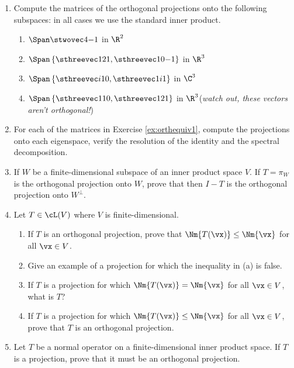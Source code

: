 \begin{exercises}
\begin{enumerate}[label=\thesubsection.\arabic*., align=right]
  \item Compute the matrices of the orthogonal projections onto the following subspaces: in all cases we use the standard inner product.
  \begin{enumerate}
    \item $\Span\stwovec 4{-1}$ in $\R^2$
    \item $\Span\left\{\sthreevec 121,\sthreevec 10{-1}\right\}$ in $\R^3$
    \item $\Span\left\{\sthreevec i10,\sthreevec 1i1\right\}$ in $\C^3$
    \item $\Span\left\{\sthreevec 110,\sthreevec 121\right\}$ in $\R^3$\quad (\emph{watch out, these vectors aren't orthogonal!})
	\end{enumerate}
	
	\item For each of the matrices in Exercise \ref{ex:orthequiv1}, compute the projections onto each eigenspace, verify the resolution of the identity and the spectral decomposition.
	
	\item If $W$ be a finite-dimensional subspace of an inner product space $V$. If $T=\pi_W$ is the orthogonal projection onto $W$, prove that then $I-T$ is the orthogonal projection onto $W^\perp$.
	
	\item Let $T\in\cL(V)$ where $V$ is finite-dimensional.
	\begin{enumerate}
	  \item If $T$ is an orthogonal projection, prove that $\Nm{T(\vx)}\le\Nm{\vx}$ for all $\vx\in V$.
	 	\item Give an example of a projection for which the inequality in (a) is false.
	 	\item If $T$ is a projection for which $\Nm{T(\vx)}=\Nm{\vx}$ for all $\vx\in V$, what is $T$?
	 	\item If $T$ is a projection for which $\Nm{T(\vx)}\le\Nm{\vx}$ for all $\vx\in V$, prove that $T$ is an orthogonal projection.
	\end{enumerate}
	
	\item Let $T$ be a normal operator on a finite-dimensional inner product space. If $T$ is a projection, prove that it must be an orthogonal projection.
	

\end{enumerate}
\end{exercises}
